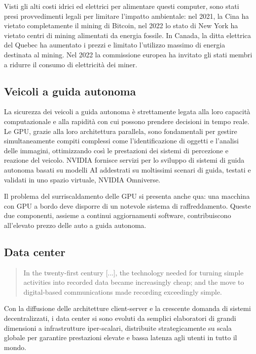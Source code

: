 \documentclass[12pt,a4paper,oneside]{book}
\begin{document}
Visti gli alti costi idrici ed elettrici per alimentare questi computer, sono stati presi provvedimenti legali per limitare l'impatto ambientale: nel 2021, la Cina ha vietato completamente il mining di Bitcoin, nel 2022 lo stato di New York ha vietato centri di mining alimentati da energia fossile. In Canada, la ditta elettrica del Quebec ha aumentato i prezzi e limitato l'utilizzo massimo di energia destinata al mining. Nel 2022 la commissione europea ha invitato gli stati membri a ridurre il consumo di elettricità dei miner.

\subsection{Veicoli a guida autonoma}

La sicurezza dei veicoli a guida autonoma è strettamente legata alla loro capacità computazionale e alla rapidità con cui possono prendere decisioni in tempo reale. Le GPU, grazie alla loro architettura parallela, sono fondamentali per gestire simultaneamente compiti complessi come l'identificazione di oggetti e l'analisi delle immagini, ottimizzando così le prestazioni dei sistemi di percezione e reazione del veicolo. NVIDIA fornisce servizi per lo sviluppo di sistemi di guida autonoma basati su modelli AI addestrati su moltissimi scenari di guida, testati e validati in uno spazio virtuale, NVIDIA Omniverse.

Il problema del surriscaldamento delle GPU si presenta anche qua: una macchina con GPU a bordo deve disporre di un notevole sistema di raffreddamento. Queste due componenti, assieme a continui aggiornamenti software, contribuiscono all'elevato prezzo delle auto a guida autonoma.

\subsection{Data center}

\begin{quote}
\small
In the twenty-first century [...], the technology needed for turning simple activities into recorded data became increasingly cheap; and the move to digital-based communications made recording exceedingly simple.\citep[p.28]{srnicek2017platform}
\end{quote}

Con la diffusione delle architetture client-server e la crescente domanda di sistemi decentralizzati, i data center si sono evoluti da semplici elaboratori di grandi dimensioni a infrastrutture iper-scalari, distribuite strategicamente su scala globale per garantire prestazioni elevate e bassa latenza agli utenti in tutto il mondo.
\end{document}
